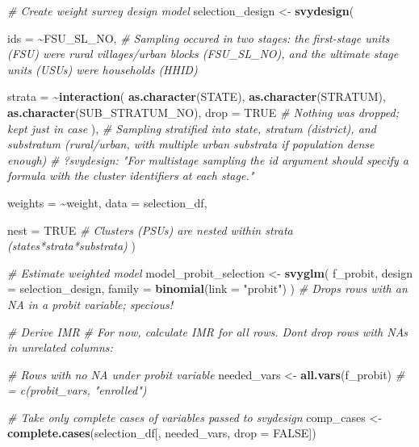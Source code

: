 \documentclass[
]{article}
\newenvironment{Shaded}{\begin{snugshade}}{\end{snugshade}}
\newcommand{\AttributeTok}[1]{\textcolor[rgb]{0.13,0.29,0.53}{#1}}
\newcommand{\CommentTok}[1]{\textcolor[rgb]{0.56,0.35,0.01}{\textit{#1}}}
\newcommand{\ConstantTok}[1]{\textcolor[rgb]{0.56,0.35,0.01}{#1}}
\newcommand{\FunctionTok}[1]{\textcolor[rgb]{0.13,0.29,0.53}{\textbf{#1}}}
\newcommand{\NormalTok}[1]{#1}
\newcommand{\OtherTok}[1]{\textcolor[rgb]{0.56,0.35,0.01}{#1}}
\newcommand{\SpecialCharTok}[1]{\textcolor[rgb]{0.81,0.36,0.00}{\textbf{#1}}}
\newcommand{\StringTok}[1]{\textcolor[rgb]{0.31,0.60,0.02}{#1}}
\begin{document}
\begin{Shaded}
\begin{Highlighting}[]
\CommentTok{\# Create weight survey design model}
\NormalTok{selection\_design }\OtherTok{\textless{}{-}} \FunctionTok{svydesign}\NormalTok{(}
  
  \AttributeTok{ids =} \SpecialCharTok{\textasciitilde{}}\NormalTok{FSU\_SL\_NO, }
  \CommentTok{\# Sampling occured in two stages: the first{-}stage units (FSU) were rural villages/urban blocks (FSU\_SL\_NO), and the ultimate stage units (USUs) were households (HHID)}
  
  \AttributeTok{strata =} \SpecialCharTok{\textasciitilde{}}\FunctionTok{interaction}\NormalTok{(}
    \FunctionTok{as.character}\NormalTok{(STATE),}
    \FunctionTok{as.character}\NormalTok{(STRATUM),}
    \FunctionTok{as.character}\NormalTok{(SUB\_STRATUM\_NO),}
    \AttributeTok{drop =} \ConstantTok{TRUE} \CommentTok{\# Nothing was dropped; kept just in case}
\NormalTok{    ), }
  \CommentTok{\# Sampling stratified into state, stratum (district), and substratum (rural/urban, with multiple urban substrata if population dense enough)}
\CommentTok{\# ?svydesign: "For multistage sampling the id argument should specify a formula with the cluster identifiers at each stage."}

  \AttributeTok{weights =} \SpecialCharTok{\textasciitilde{}}\NormalTok{weight,}
  \AttributeTok{data =}\NormalTok{ selection\_df,}
  
  \AttributeTok{nest =} \ConstantTok{TRUE} \CommentTok{\# Clusters (PSUs) are nested within strata (states*strata*substrata)}
\NormalTok{)}

\CommentTok{\# Estimate weighted model}
\NormalTok{model\_probit\_selection }\OtherTok{\textless{}{-}} \FunctionTok{svyglm}\NormalTok{(}
\NormalTok{  f\_probit,}
  \AttributeTok{design =}\NormalTok{ selection\_design,}
  \AttributeTok{family =} \FunctionTok{binomial}\NormalTok{(}\AttributeTok{link =} \StringTok{"probit"}\NormalTok{)}
\NormalTok{) }\CommentTok{\# Drops rows with an NA in a probit variable; specious!}



\CommentTok{\# Derive IMR}
\CommentTok{\# For now, calculate IMR for all rows. Don\textquotesingle{}t drop rows with NAs in unrelated columns:}

\CommentTok{\# Rows with no NA under probit variable}
\NormalTok{needed\_vars }\OtherTok{\textless{}{-}} \FunctionTok{all.vars}\NormalTok{(f\_probit) }\CommentTok{\# = c(probit\_vars, "enrolled") }

\CommentTok{\# Take only complete cases of variables passed to svydesign}
\NormalTok{comp\_cases }\OtherTok{\textless{}{-}} \FunctionTok{complete.cases}\NormalTok{(selection\_df[, needed\_vars, }\AttributeTok{drop =} \ConstantTok{FALSE}\NormalTok{])}


\end{Highlighting}
\end{Shaded}
\end{document}
